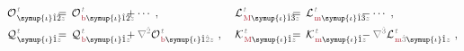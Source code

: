 \begin{subequations} \label{eq:multipole-modify}
	\abovedisplayskip=0pt
\begin{align}
	&{\mathcal{O}}^{\;\!\mathcolor{gray}{t}}_{\;\! \symup{\iota}\hat{1}\hat{2} \mathcolor{gray}{z}} \hspace{-2.0em}&&=\hspace{0.2em} {\mathcal{O}}^{\;\!\mathcolor{gray}{t}}_{\;\!\textcolor{Maroon}{\text{b}} \symup{\iota}\hat{1}\hat{2} \mathcolor{gray}{z}} &&\hspace{-2.0em}+ \cdots~, &&\hspace{0.3em} {\mathcal{L}}^{\;\!\mathcolor{gray}{t}}_{\;\!\textcolor{Maroon}{\text{M}} \symup{\iota}\hat{1}\hat{3} \mathcolor{gray}{z}} \hspace{-2.0em}&&=\hspace{0.2em} {\mathcal{L}}^{\;\!\mathcolor{gray}{t}}_{\;\!\textcolor{Maroon}{\text{m}} \symup{\iota}\hat{1}\hat{3} \mathcolor{gray}{z}} &&\hspace{-2.0em}- \cdots~, \label{eq:Ob-LM} \\
	&{\mathcal{Q}}^{\;\!\mathcolor{gray}{t}}_{\;\! \symup{\iota}\hat{1} \mathcolor{gray}{z}} \hspace{-2.0em}&&=\hspace{0.2em} {\mathcal{Q}}^{\;\!\mathcolor{gray}{t}}_{\;\!\textcolor{Maroon}{\text{b}} \symup{\iota}\hat{1} \mathcolor{gray}{z}} &&\hspace{-2.0em}+ \mathcolor{gray}{\nabla^{\hat{2}}} {\mathcal{O}}^{\;\!\mathcolor{gray}{t}}_{\;\!\textcolor{Maroon}{\text{b}} \symup{\iota} \hat{1} \mathcolor{gray}{\hat{2}} \mathcolor{gray}{z}}~,  &&\hspace{0.3em} {\mathcal{K}}^{\;\!\mathcolor{gray}{t}}_{\;\!\textcolor{Maroon}{\text{M}} \symup{\iota}\hat{1} \mathcolor{gray}{z}} \hspace{-2.0em}&&=\hspace{0.2em} {\mathcal{K}}^{\;\!\mathcolor{gray}{t}}_{\;\!\textcolor{Maroon}{\text{m}} \symup{\iota}\hat{1} \mathcolor{gray}{z}} &&\hspace{-2.0em}- \mathcolor{gray}{\nabla^{\hat{3}}} {\mathcal{L}}^{\;\!\mathcolor{gray}{t}}_{\;\!\textcolor{Maroon}{\text{m}} \mathcolor{gray}{\hat{3}} \symup{\iota}\hat{1} \mathcolor{gray}{z}}~, \label{eq:Qb-KM} \\

\end{align}
\end{subequations}

